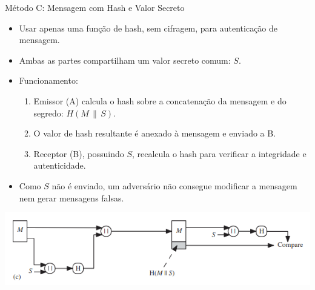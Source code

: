 \begin{frame}{Método C: Mensagem com Hash e Valor Secreto}
    \begin{itemize}
        \item Usar apenas uma função de hash, sem cifragem, para autenticação de mensagem.
        \item Ambas as partes compartilham um valor secreto comum: $S$.
        \item Funcionamento:
              \begin{enumerate}
                  \item Emissor (A) calcula o hash sobre a concatenação da mensagem e do segredo: $H(M \,\|\, S)$.
                  \item O valor de hash resultante é anexado à mensagem e enviado a B.
                  \item Receptor (B), possuindo $S$, recalcula o hash para verificar a integridade e autenticidade.
              \end{enumerate}

        \item Como $S$ não é enviado, um adversário não consegue modificar a mensagem nem gerar mensagens falsas.
    \end{itemize}

    \centering
    \includegraphics[width=0.7\linewidth]{Figuras/esquema3-hash.png}
\end{frame}





